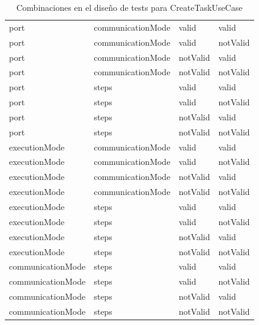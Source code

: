 \begin{table}[H]
\begin{tabular}{llll}
        port          & communicationMode & valid           & valid           \\
        port          & communicationMode & valid           & notValid        \\
        port          & communicationMode & notValid        & valid           \\
        port          & communicationMode & notValid        & notValid        \\
        port          & steps             & valid           & valid           \\
        port          & steps             & valid           & notValid        \\
        port          & steps             & notValid        & valid           \\
        port          & steps             & notValid        & notValid        \\
        executionMode & communicationMode & valid           & valid           \\
        executionMode & communicationMode & valid           & notValid        \\
        executionMode & communicationMode & notValid        & valid           \\
        executionMode & communicationMode & notValid        & notValid        \\
        executionMode          & steps             & valid           & valid           \\
        executionMode          & steps             & valid           & notValid        \\
        executionMode          & steps             & notValid        & valid           \\
        executionMode          & steps             & notValid        & notValid        \\
        communicationMode      & steps             & valid           & valid           \\
        communicationMode      & steps             & valid           & notValid        \\
        communicationMode      & steps             & notValid        & valid           \\
        communicationMode      & steps             & notValid        & notValid
    \end{tabular}
    \caption{Combinaciones en el diseño de tests para CreateTaskUseCase}\label{tab:combCreateTaskUseCase}
\end{table}

